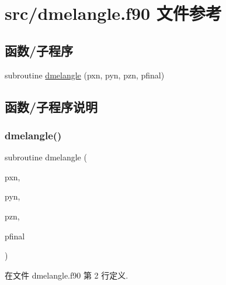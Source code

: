\hypertarget{dmelangle_8f90}{}\section{src/dmelangle.f90 文件参考}
\label{dmelangle_8f90}
\subsection*{函数/子程序}
\begin{DoxyCompactItemize}
\item 
subroutine \mbox{\hyperlink{dmelangle_8f90_aa5c23ea4ebf6368de7fef9406f31e7f3}{dmelangle}} (pxn, pyn, pzn, pfinal)
\end{DoxyCompactItemize}


\subsection{函数/子程序说明}
\mbox{\label{dmelangle_8f90_aa5c23ea4ebf6368de7fef9406f31e7f3}} 
\subsubsection{\texorpdfstring{dmelangle()}{dmelangle()}}
{\footnotesize\ttfamily subroutine dmelangle (\begin{DoxyParamCaption}\item[{}]{pxn,  }\item[{}]{pyn,  }\item[{}]{pzn,  }\item[{}]{pfinal }\end{DoxyParamCaption})}



在文件 dmelangle.\+f90 第 2 行定义.


